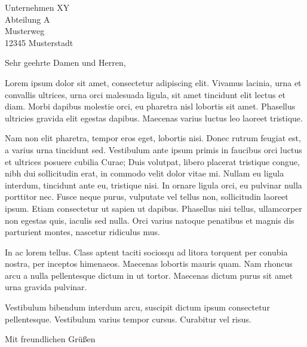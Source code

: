 \documentclass{applicationletter}
\author{Max Mustermann}
\date{Musterstadt, \today}
\begin{document}
 
\begin{letter}{Unternehmen XY \\ Abteilung A \\ Musterweg \\ 12345 Musterstadt}


\opening{Sehr geehrte Damen und Herren,}

Lorem ipsum dolor sit amet, consectetur adipiscing elit. Vivamus lacinia, urna et convallis ultrices, urna orci malesuada ligula, sit amet tincidunt elit lectus et diam. Morbi dapibus molestie orci, eu pharetra nisl lobortis sit amet. Phasellus ultricies gravida elit egestas dapibus. Maecenas varius luctus leo laoreet tristique.


Nam non elit pharetra, tempor eros eget, lobortis nisi. Donec rutrum feugiat est, a varius urna tincidunt sed. Vestibulum ante ipsum primis in faucibus orci luctus et ultrices posuere cubilia Curae; Duis volutpat, libero placerat tristique congue, nibh dui sollicitudin erat, in commodo velit dolor vitae mi. Nullam eu ligula interdum, tincidunt ante eu, tristique nisi. In ornare ligula orci, eu pulvinar nulla porttitor nec. Fusce neque purus, vulputate vel tellus non, sollicitudin laoreet ipsum. Etiam consectetur ut sapien ut dapibus. Phasellus nisi tellus, ullamcorper non egestas quis, iaculis sed nulla. Orci varius natoque penatibus et magnis dis parturient montes, nascetur ridiculus mus. 

In ac lorem tellus. Class aptent taciti sociosqu ad litora torquent per conubia nostra, per inceptos himenaeos. Maecenas lobortis mauris quam. Nam rhoncus arcu a nulla pellentesque dictum in ut tortor. Maecenas dictum purus sit amet urna gravida pulvinar.

Vestibulum bibendum interdum arcu, suscipit dictum ipsum consectetur pellentesque. Vestibulum varius tempor cursus. Curabitur vel risus.

\closing{Mit freundlichen Grüßen}


\end{letter}
\end{document}
